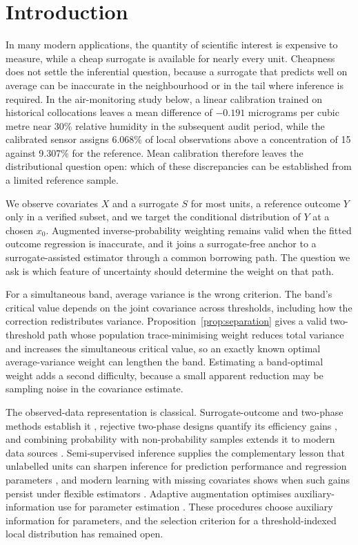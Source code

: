 \section{Introduction}
In many modern applications, the quantity of scientific interest is expensive to measure, while a cheap surrogate is available for nearly every unit. Cheapness does not settle the inferential question, because a surrogate that predicts well on average can be inaccurate in the neighbourhood or in the tail where inference is required. In the air-monitoring study below, a linear calibration trained on historical collocations leaves a mean difference of $-0.191$ micrograms per cubic metre near 30\% relative humidity in the subsequent audit period, while the calibrated sensor assigns 6.068\% of local observations above a concentration of 15 against 9.307\% for the reference. Mean calibration therefore leaves the distributional question open: which of these discrepancies can be established from a limited reference sample.

We observe covariates $X$ and a surrogate $S$ for most units, a reference outcome $Y$ only in a verified subset, and we target the conditional distribution of $Y$ at a chosen $x_0$. Augmented inverse-probability weighting remains valid when the fitted outcome regression is inaccurate, and it joins a surrogate-free anchor to a surrogate-assisted estimator through a common borrowing path. The question we ask is which feature of uncertainty should determine the weight on that path.

For a simultaneous band, average variance is the wrong criterion. The band's critical value depends on the joint covariance across thresholds, including how the correction redistributes variance. Proposition~\ref{prop:separation} gives a valid two-threshold path whose population trace-minimising weight reduces total variance and increases the simultaneous critical value, so an exactly known optimal average-variance weight can lengthen the band. Estimating a band-optimal weight adds a second difficulty, because a small apparent reduction may be sampling noise in the covariance estimate.

The observed-data representation is classical. Surrogate-outcome and two-phase methods establish it \citep{Pepe1992,RobinsRotnitzkyZhao1994,TaoZengLin2017,Tsiatis2006}, rejective two-phase designs quantify its efficiency gains \citep{YangDing2025}, and combining probability with non-probability samples extends it to modern data sources \citep{YangKimSong2021}. Semi-supervised inference supplies the complementary lesson that unlabelled units can sharpen inference for prediction performance and regression parameters \citep{GronsbellCai2018,GronsbellEtAl2022,AzrielEtAl2022,ChakraborttyCai2018,ZhangBrownCai2019,Song2024}, and modern learning with missing covariates shows when such gains persist under flexible estimators \citep{MaWangSamworth2026}. Adaptive augmentation optimises auxiliary-information use for parameter estimation \citep{CaoTsiatisDavidian2009}. These procedures choose auxiliary information for parameters, and the selection criterion for a threshold-indexed local distribution has remained open.


